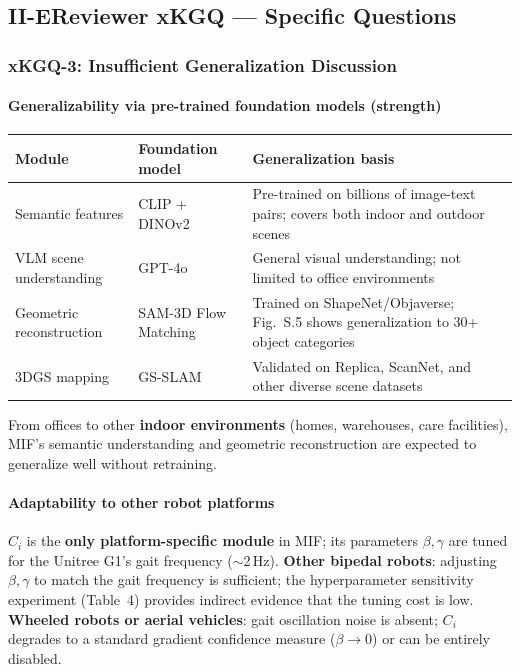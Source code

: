 \documentclass[10pt,a4paper]{article}
\begin{document}
\subsection*{II-E\enspace Reviewer xKGQ --- Specific Questions}

\subsubsection*{xKGQ-3: Insufficient Generalization Discussion}

\paragraph{Generalizability via pre-trained foundation models (strength)}
\begin{table}[h]
\centering\small
\begin{tabular}{L{2.5cm}L{3.2cm}L{6cm}}
\toprule
\textbf{Module} & \textbf{Foundation model} & \textbf{Generalization basis}\\
\midrule
Semantic features & CLIP + DINOv2 & Pre-trained on billions of image-text pairs; covers both indoor and outdoor scenes\\
VLM scene understanding & GPT-4o & General visual understanding; not limited to office environments\\
Geometric reconstruction & SAM-3D Flow Matching & Trained on ShapeNet/Objaverse; Fig.~S.5 shows generalization to 30+ object categories\\
3DGS mapping & GS-SLAM & Validated on Replica, ScanNet, and other diverse scene datasets\\
\bottomrule
\end{tabular}
\end{table}

From offices to other \textbf{indoor environments} (homes, warehouses, care facilities), MIF's semantic understanding and geometric reconstruction are expected to generalize well without retraining.

\paragraph{Adaptability to other robot platforms}
$C_i$ is the \textbf{only platform-specific module} in MIF; its parameters $\beta,\gamma$ are tuned for the Unitree G1's gait frequency (${\sim}$2\,Hz). \textbf{Other bipedal robots}: adjusting $\beta,\gamma$ to match the gait frequency is sufficient; the hyperparameter sensitivity experiment (Table~4) provides indirect evidence that the tuning cost is low. \textbf{Wheeled robots or aerial vehicles}: gait oscillation noise is absent; $C_i$ degrades to a standard gradient confidence measure ($\beta\to 0$) or can be entirely disabled.
\end{document}
